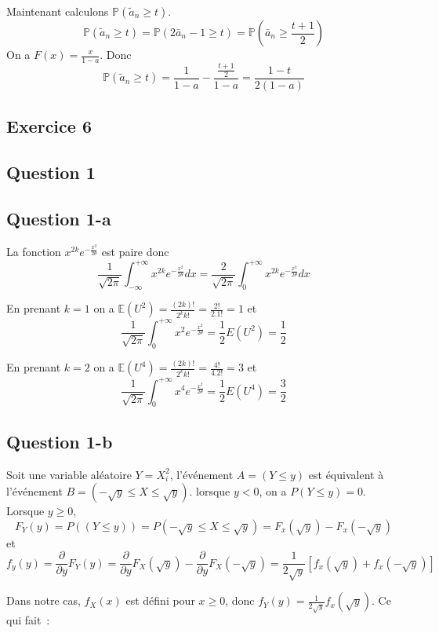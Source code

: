 \documentclass[]{book}
\theoremstyle{definition}
\begin{document}
Maintenant calculons $\mathbb{P}(\tilde{a}_n \geq t)$.
$$
\mathbb{P}(\tilde{a}_n \geq t) = \mathbb{P}(2\bar{a}_n - 1 \geq t) = \mathbb{P}\left(\bar{a}_n \geq \frac{t +1}{2}\right)
$$
On a $F(x) = \frac{x}{1-a}$.
Donc 
$$
\mathbb{P}(\tilde{a}_n \geq t) = \frac{1}{1-a} - \frac{\frac{t +1}{2}}{1-a} = \frac{1-t}{2(1-a)}
$$

\subsection*{Exercice 6}
\subsection*{Question 1}
\subsection*{Question 1-a}

La fonction $x^{2k}e^{-\frac{x^2}{2\theta}}$ est paire donc 
$$
\frac{1}{\sqrt{2\pi}} \int_{-\infty}^{+\infty} x^{2k}e^{-\frac{x^2}{2\theta}} dx = \frac{2}{\sqrt{2\pi}} \int_{0}^{+\infty} x^{2k}e^{-\frac{x^2}{2\theta}} dx
$$

En prenant $k=1$ on a $\mathbb{E}(U^{2}) = \frac{(2k)!}{2^kk!} = \frac{2!}{2.1!} = 1$ et 
$$
\frac{1}{\sqrt{2\pi}} \int_{0}^{+\infty} x^{2}e^{-\frac{x^2}{2\theta}} = \frac{1}{2} E(U^2) = \frac{1}{2}
$$

En prenant $k=2$ on a $\mathbb{E}(U^{4}) = \frac{(2k)!}{2^kk!} = \frac{4!}{4.2!} = 3$ et
$$
\frac{1}{\sqrt{2\pi}} \int_{0}^{+\infty} x^{4}e^{-\frac{x^2}{2\theta}} = \frac{1}{2} E(U^4) = \frac{3}{2}
$$


\subsection*{Question 1-b}
Soit une variable al\'eatoire $Y = X_i^2$, l'\'ev\'enement $A = (Y \leq y)$ est \'equivalent \`a l'\'ev\'enement $B = (-\sqrt{y} \leq X \leq \sqrt{y})$. lorsque $y < 0$, on a $P(Y \leq y)=0$.
Lorsque $y \geq 0$,
$$
F_{Y}(y) = P( (Y \leq y)) = P (-\sqrt{y} \leq X \leq \sqrt{y}) = F_{x}(\sqrt{y}) - F_{x}(-\sqrt{y})
$$
et
$$
f_{y}(y) = \frac{\partial}{\partial y} F_{Y}(y) = \frac{\partial}{\partial y} F_{X}(\sqrt{y}) - \frac{\partial}{\partial y} F_{X}(-\sqrt{y}) = \frac{1}{2\sqrt{y}}[f_{x}(\sqrt{y}) + f_{x}(-\sqrt{y})]
$$

Dans notre cas, $f_{X}(x)$ est d\'efini pour $x \geq 0$, donc $f_{Y}(y)=\frac{1}{2\sqrt{y}}f_{x}(\sqrt{y})$. Ce qui fait~:
\end{document}
